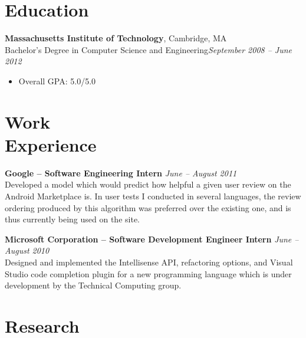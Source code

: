 \documentclass[margin,line]{resume}
\begin{document}
\begin{resume}

\section{\mysidestyle Education}

\textbf{Massachusetts Institute of Technology}, Cambridge, MA \vspace{0mm}\\\vspace{1mm}%
Bachelor's Degree in Computer Science and Engineering\hfill \textsl{September 2008 -- June 2012}\vspace{-0.8mm}
\begin{itemize}
\item Overall GPA: 5.0/5.0 \\
\end{itemize}

\vspace{-6.5mm}

\section{\mysidestyle Work\\Experience}

\textbf{Google -- Software Engineering Intern} \hfill \textsl{June -- August 2011}\\
Developed a model which would predict how helpful a given user review on the Android Marketplace is.
In user tests I conducted in several languages, the review ordering produced by this algorithm
was preferred over the existing one, and is thus currently being used on the site.

\textbf{Microsoft Corporation -- Software Development Engineer Intern} \hfill \textsl{June -- August 2010}\\
Designed and implemented the Intellisense API, refactoring options, and Visual Studio code completion plugin for a new programming language which is under development by the Technical Computing group.

\section{\mysidestyle Research}


\end{resume}
\end{document}
